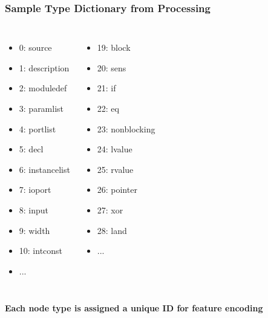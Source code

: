 \documentclass[aspectratio=169]{beamer}
\begin{document}
\begin{frame}
\frametitle{Sample Type Dictionary from Processing}
\begin{columns}
\begin{itemize}
    \item 0: source
    \item 1: description
    \item 2: moduledef
    \item 3: paramlist
    \item 4: portlist
    \item 5: decl
    \item 6: instancelist
    \item 7: ioport
    \item 8: input
    \item 9: width
    \item 10: intconst
    \item ...
\end{itemize}

\begin{itemize}
    \item 19: block
    \item 20: sens
    \item 21: if
    \item 22: eq
    \item 23: nonblocking
    \item 24: lvalue
    \item 25: rvalue
    \item 26: pointer
    \item 27: xor
    \item 28: land
    \item ...
\end{itemize}
\end{columns}

\textbf{Each node type is assigned a unique ID for feature encoding}
\end{frame}
\end{document}
